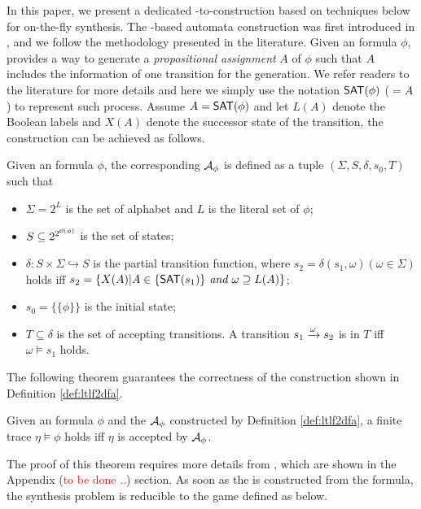 In this paper, we present a dedicated \ltlf-to-\tdfa construction based on \SAT techniques below for on-the-fly synthesis. The \SAT-based automata construction was first introduced in \cite{LRPZV19}, and we follow the methodology presented in the literature. Given an \ltlf formula $\phi$, \cite{LRPZV19} provides a way to generate a \emph{propositional assignment} $A$ of $\phi$ such that $A$ includes the information of one transition for the \NFA generation. We refer readers to the literature for more details and here we simply use the notation $\textsf{SAT}(\phi)$ ($=A$) to represent such process. Assume $A=\textsf{SAT}(\phi)$ and let $L(A)$ denote the Boolean labels and $X(A)$ denote the successor state of the transition, the \tdfa construction can be achieved as follows.  

\begin{definition}\label{def:ltlf2dfa}
Given an \ltlf formula $\phi$, the corresponding \TDFA ${\mathcal{A}_{\phi}}$ is defined as a tuple $(\Sigma, S, \delta, s_0, T)$ such that
\begin{itemize}
	\item $\Sigma = 2^{L}$ is the set of alphabet and $L$ is the literal set of $\phi$;
	\item $S\subseteq 2^{2^{{\sf cl}(\phi)}}$ is the set of states;
	\item $\delta:  S \times \Sigma \hookrightarrow S$ is the partial transition function, where $s_2 = \delta(s_1, \omega) (\omega \in \Sigma)$ holds iff $s_2=\{X(A) | A\in\{\textsf{SAT}(s_1)\}\textit{ and }\omega \supseteq L(A)\}$;
	\item $s_0 = \{\{\phi \}\}$ is the initial state;
	\item $T\subseteq \delta$ is the set of accepting transitions. A transition $s_1\xrightarrow[]{\omega}s_2$ is in $T$ iff $\omega\models s_1$ holds. 
\end{itemize}

\end{definition}

The following theorem guarantees the correctness of the \tdfa construction shown in Definition \ref{def:ltlf2dfa}. 

\begin{theorem}
Given an \ltlf formula $\phi$ and the \tdfa ${\mathcal{A}_{\phi}}$ constructed by Definition \ref{def:ltlf2dfa}, a finite trace $\eta\models\phi$ holds iff $\eta$ is accepted by ${\mathcal{A}_{\phi}}$. 
\end{theorem}
The proof of this theorem requires more details from \cite{LRPZV19}, which are shown in the Appendix (\textcolor{red}{to be done ..}) section.
As soon as the \tdfa is constructed from the \ltlf formula, the synthesis problem is reducible to the \tdfa game defined as below.

